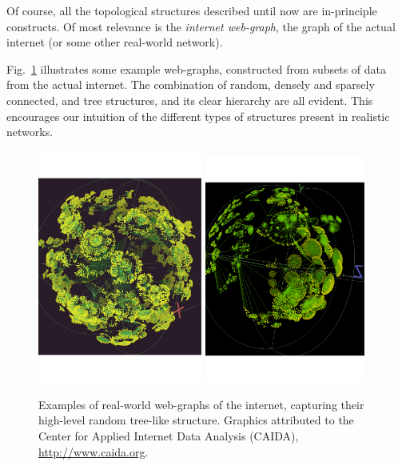 Of course, all the topological structures described until now are in-principle constructs. Of most relevance is the \textit{internet web-graph}, the graph of the actual internet (or some other real-world network).

Fig.~\ref{fig:webgraph} illustrates some example web-graphs, constructed from subsets of data from the actual internet. The combination of random, densely and sparsely connected, and tree structures, and its clear hierarchy are all evident. This encourages our intuition of the different types of structures present in realistic networks.

\begin{figure}[!htbp]
\includegraphics[width=0.481\textwidth]{webgraph_1}
\includegraphics[width=0.47\textwidth]{webgraph_2}
\caption{Examples of real-world web-graphs of the internet, capturing their high-level random tree-like structure. Graphics attributed to the Center for Applied Internet Data Analysis (CAIDA), \href{http://www.caida.org}{http://www.caida.org}.} \label{fig:webgraph}
\end{figure}

